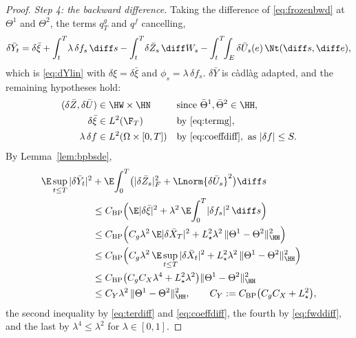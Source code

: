 \begin{proof}
\emph{Step 4: the backward difference.} Taking the difference of \eqref{eq:frozenbwd} at
$\Theta^1$ and $\Theta^2$, the terms $q^g_T$ and $q^f$ cancelling,
\[
\delta\bar Y_t=\delta\bar\xi+\int_t^T\!\lambda\,\delta f_s\,\diff s
-\int_t^T\!\delta\bar Z_s\,\diff W_s-\int_t^T\!\!\int_E\delta\bar U_s(e)\,\Nt(\diff s,\diff e) ,
\]
which is \eqref{eq:dYlin} with $\delta\xi=\delta\bar\xi$ and $\phi_s=\lambda\,\delta f_s$.
$\delta\bar Y$ is c\`adl\`ag adapted, and the remaining hypotheses hold:
\[
\begin{alignedat}{2}
(\delta\bar Z,\delta\bar U)&\in\HW\times\HN
&\quad&\text{since }\bar\Theta^1,\bar\Theta^2\in\HH,\\
\delta\bar\xi&\in L^2(\F_T) &&\text{by }\eqref{eq:termg},\\
\lambda\,\delta f&\in L^2(\Omega\times[0,T]) &&\text{by }\eqref{eq:coeffdiff},
\text{ as }|\delta f|\le S.
\end{alignedat}
\]
By Lemma~\ref{lem:bpbsde},
\begin{equation}\label{eq:bwddiff}
\begin{aligned}
\E\sup_{t\le T}|\delta\bar Y_t|^2
&+\E\!\int_0^T\!\big(|\delta\bar Z_s|_F^2+\Lnorm{\delta\bar U_s}^2\big)\diff s\\
&\le C_{\mathrm{BP}}\Big(\E|\delta\bar\xi|^2+\lambda^2\,\E\!\int_0^T\!|\delta f_s|^2\,\diff s\Big)\\
&\le C_{\mathrm{BP}}\Big(C_g\lambda^2\,\E|\delta\bar X_T|^2
+L_\star^2\lambda^2\,\|\Theta^1-\Theta^2\|_{\HH}^2\Big)\\
&\le C_{\mathrm{BP}}\Big(C_g\lambda^2\,\E\sup_{t\le T}|\delta\bar X_t|^2
+L_\star^2\lambda^2\,\|\Theta^1-\Theta^2\|_{\HH}^2\Big)\\
&\le C_{\mathrm{BP}}\big(C_gC_X\lambda^4+L_\star^2\lambda^2\big)\|\Theta^1-\Theta^2\|_{\HH}^2\\
&\le C_Y\lambda^2\,\|\Theta^1-\Theta^2\|_{\HH}^2 ,
\qquad C_Y:=C_{\mathrm{BP}}\big(C_gC_X+L_\star^2\big) ,
\end{aligned}
\end{equation}
the second inequality by \eqref{eq:terdiff} and \eqref{eq:coeffdiff}, the fourth by
\eqref{eq:fwddiff}, and the last by $\lambda^4\le\lambda^2$ for $\lambda\in[0,1]$.


\end{proof}
